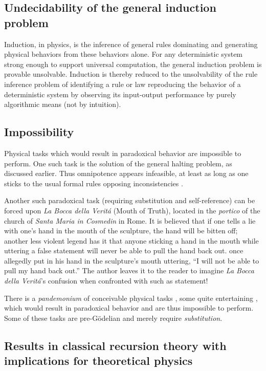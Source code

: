 \documentclass[%
 reprint,
 showpacs,
 showkeys,
 preprintnumbers,
 amsmath,amssymb,
 aps,
 prl,
  longbibliography,
 ]{revtex4-1}
\begin{document}
\subsection{Undecidability of the general induction problem}

Induction, in physics, is the inference of general rules
dominating and generating physical behaviors from these behaviors alone.
For any deterministic system strong enough to support
universal computation, the general induction problem
is provable unsolvable.
Induction is thereby reduced to the unsolvability of
the rule inference problem \citep{go-67,blum75blum,angluin:83,ad-91,li:92}
of identifying a rule or law reproducing the behavior of a deterministic system
by observing its input-output performance by purely algorithmic means
(not by intuition).

\subsection{Impossibility}

Physical tasks which would result in paradoxical
behavior \citep{hilbert-26} are impossible to perform.
One such task is the solution of the general halting problem, as discussed earlier.
Thus omnipotence appears infeasible, at least as long as one sticks to the usual
formal rules opposing inconsistencies \cite[163]{hilbert-26}.

Another such paradoxical task (requiring substitution and self-reference) can be forced upon  {\it La Bocca della Verit\'a} (Mouth of Truth),
located in the {\it portico} of the church of {\it Santa Maria in Cosmedin} in Rome.
It is believed that if one tells a lie with one's hand in the mouth of the sculpture,
the hand will be bitten off; another less violent legend has it that anyone sticking a hand in the mouth while
uttering a false statement will never be able to pull the hand back out.
\citet[178]{rucker} once allegedly put in his hand in the sculpture's mouth uttering, {``I will not be able to pull my hand back out.''}
The author leaves it to the reader to imagine {\it La Bocca della Verit\'a}'s confusion when confronted with such as statement!

There is a {\em pandemonium} of conceivable physical tasks \citep{barrow-impossibilities},
some quite entertaining \citep{smullyan-78}, which would result in paradoxical behavior and
are thus impossible to perform.
Some of these tasks are pre-G\"odelian and merely require {\em substitution}.

\subsection{Results in classical recursion theory with implications for theoretical physics}
\end{document}

